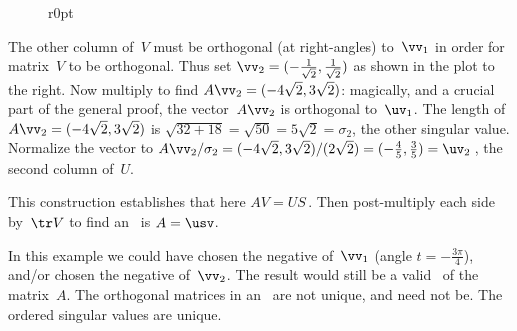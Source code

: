 \begin{example}
\begin{solution}
\begin{wrapfigure}r{0pt}
\end{wrapfigure}
The other column of~\(V\) must be orthogonal (at right-angles) to~\(\vv_1\) in order for matrix~\(V\) to be orthogonal.
Thus set \(\vv_2=(-\frac1{\sqrt2},\frac1{\sqrt2})\) as shown in the  plot to the right.
Now multiply to find \(A\vv_2=(-4\sqrt2,3\sqrt2)\):
magically, and a crucial part of the general proof, the vector~\(A\vv_2\) is orthogonal to~\(\uv_1\).
The length of \(A\vv_2=(-4\sqrt2,3\sqrt2)\) is \(\sqrt{32+18}=\sqrt{50}=5\sqrt2=\sigma_2\), the other singular value.
Normalize the vector to \(A\vv_2/\sigma_2 =(-4\sqrt2,3\sqrt2)/(2\sqrt2)=(-\frac45,\frac35)=\uv_2\)\,, the second column of~\(U\).

This construction establishes that here \(AV=US\)\,. 
Then post-multiply each side by~\(\tr V\) to find an \svd\ is \(A=\usv\).

In this example we could have chosen the negative of~\(\vv_1\) (angle \(t=-\frac{3\pi}4\)), and/or chosen the negative of~\(\vv_2\). 
The result would still be a valid \svd\ of the matrix~\(A\).
The orthogonal matrices in an \svd\ are not unique, and need not be. The ordered singular values are unique.
\end{solution}
\end{example}





